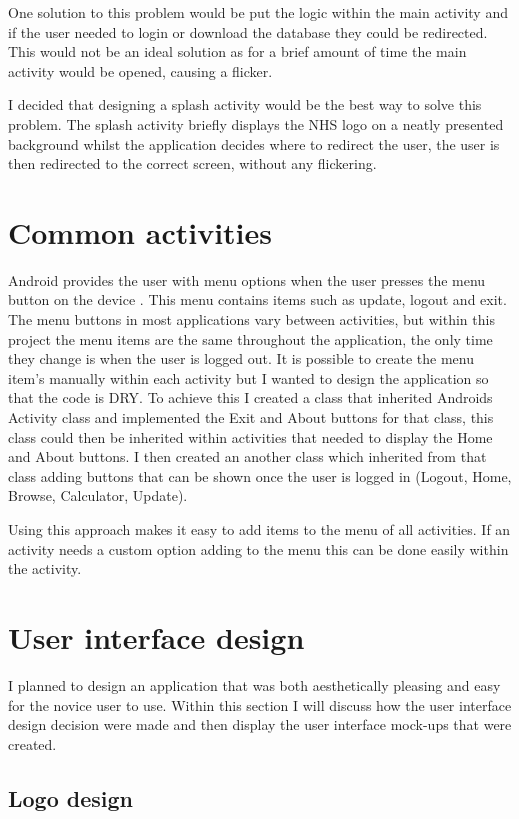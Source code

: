 One solution to this problem would be put the logic within the main activity and if the user needed to login or download the database they could be redirected. This would not be an ideal solution as for a brief amount of time the main activity would be opened, causing a flicker.

I decided that designing a splash activity would be the best way to solve this problem. The splash activity briefly displays the NHS \cite{nhs} logo on a neatly presented background whilst the application decides where to redirect the user, the user is then redirected to the correct screen, without any flickering.

\section{Common activities}
Android provides the user with menu options when the user presses the menu button on the device \cite{android}. This menu contains items such as update, logout and exit. The menu buttons in most applications vary between activities, but within this project the menu items are the same throughout the application, the only time they change is when the user is logged out. 
It is possible to create the menu item’s manually within each activity but I wanted to design the application so that the code is DRY. To achieve this I created a class that inherited Androids Activity class and implemented the Exit and About buttons for that class, this class could then be inherited within activities that needed to display the Home and About buttons. I then created an another class which inherited from that class adding buttons that can be shown once the user is logged in (Logout, Home, Browse, Calculator, Update). 

Using this approach makes it easy to add items to the menu of all activities. If an activity needs a custom option adding to the menu this can be done easily within the activity.

\section{User interface design}

I planned to design an application that was both aesthetically pleasing and easy for the novice user to use. Within this section I will discuss how the user interface design decision were made and then display the user interface mock-ups that were created.

\subsection{Logo design}

